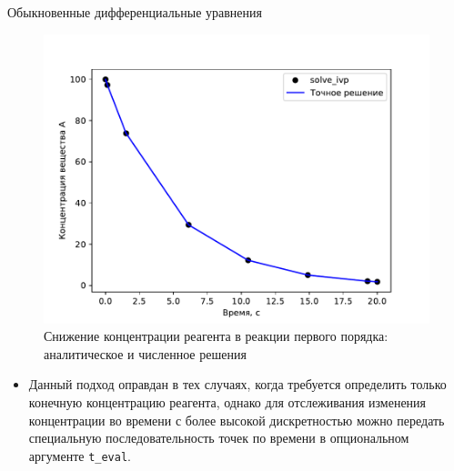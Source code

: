\documentclass[aspectratio=169, mathserif]{beamer}	%
\begin{document}
\begin{frame}[fragile, label=c]{Обыкновенные дифференциальные уравнения}
\scriptsize
\begin{minipage}{.58\linewidth}
\begin{figure}
\centering
	\includegraphics[width=\linewidth]{./pics/Figure_34}
	\caption{Снижение концентрации реагента в реакции первого порядка: аналитическое и численное решения}
\end{figure}
\end{minipage}
\begin{minipage}{.4\linewidth}
	\begin{itemize}
		\item Данный подход оправдан в тех случаях, когда требуется определить только конечную концентрацию реагента, однако для отслеживания изменения концентрации во времени с более высокой дискретностью можно передать специальную последовательность точек по времени в опциональном аргументе \texttt{t\_eval}.
	\end{itemize}
\end{minipage}
\vfill
\end{frame}
\end{document}
